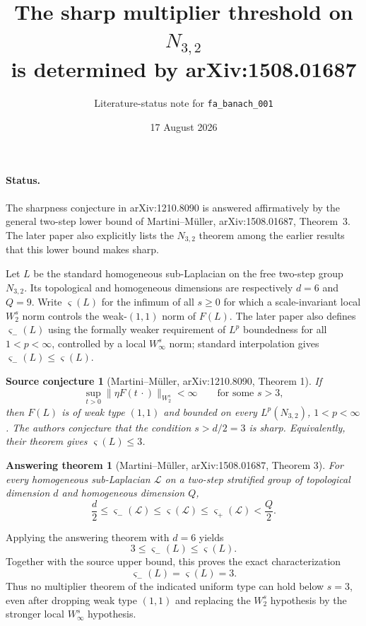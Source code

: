 \documentclass[10pt]{article}
\title{The sharp multiplier threshold on $N_{3,2}$\\
is determined by arXiv:1508.01687}
\author{Literature-status note for \texttt{fa\_banach\_001}}
\date{17 August 2026}
\newtheorem*{source}{Source conjecture}
\newtheorem*{answer}{Answering theorem}
\begin{document}
\maketitle

\paragraph{Status.}
The sharpness conjecture in arXiv:1210.8090 is answered affirmatively by the
general two-step lower bound of Martini--Müller, arXiv:1508.01687,
Theorem~3.  The later paper also explicitly lists the $N_{3,2}$ theorem among
the earlier results that this lower bound makes sharp.

Let $L$ be the standard homogeneous sub-Laplacian on the free two-step group
$N_{3,2}$.  Its topological and homogeneous dimensions are respectively
$d=6$ and $Q=9$.  Write $\varsigma(L)$ for the infimum of all $s\geq0$ for
which a scale-invariant local $W_2^s$ norm controls the weak-$(1,1)$ norm of
$F(L)$.  The later paper also defines $\varsigma_-(L)$ using the formally
weaker requirement of $L^p$ boundedness for all $1<p<\infty$, controlled by
a local $W_\infty^s$ norm; standard interpolation gives
$\varsigma_-(L)\leq\varsigma(L)$.

\begin{source}[Martini--Müller, arXiv:1210.8090, Theorem 1]
If
\[
 \sup_{t>0}\|\eta F(t\,\cdot)\|_{W_2^s}<\infty
 \qquad\text{for some }s>3,
\]
then $F(L)$ is of weak type $(1,1)$ and bounded on every $L^p(N_{3,2})$,
$1<p<\infty$.  The authors conjecture that the condition $s>d/2=3$ is
sharp.  Equivalently, their theorem gives $\varsigma(L)\leq3$.
\end{source}

\begin{answer}[Martini--Müller, arXiv:1508.01687, Theorem 3]
For every homogeneous sub-Laplacian $\mathcal L$ on a two-step stratified
group of topological dimension $d$ and homogeneous dimension $Q$,
\[
 \frac d2\leq\varsigma_-(\mathcal L)
 \leq\varsigma(\mathcal L)
 \leq\varsigma_+(\mathcal L)<\frac Q2.
\]
\end{answer}

Applying the answering theorem with $d=6$ yields
\[
 3\leq\varsigma_-(L)\leq\varsigma(L).
\]
Together with the source upper bound, this proves the exact characterization
\[
 \boxed{\varsigma_-(L)=\varsigma(L)=3.}
\]
Thus no multiplier theorem of the indicated uniform type can hold below
$s=3$, even after dropping weak type $(1,1)$ and replacing the $W_2^s$
hypothesis by the stronger local $W_\infty^s$ hypothesis.
\end{document}

